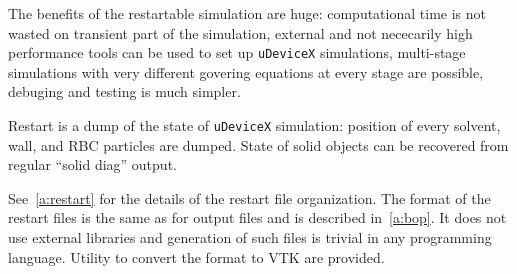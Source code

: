 The benefits of the restartable simulation are huge: computational
time is not wasted on transient part of the simulation, external and
not nececarily high performance tools can be used to
set up \texttt{uDeviceX} simulations, multi-stage simulations with very
different govering equations at every stage are possible, debuging and
testing is much simpler.

Restart is a dump of the state of \texttt{uDeviceX} simulation:
position of every solvent, wall, and RBC particles are dumped. State
of solid objects can be recovered from regular ``solid diag'' output.

See~\ref{a:restart} for the details of the restart file
organization. The format of the restart files is the same as for
output files and is described in~\ref{a:bop}. It does not use external
libraries and generation of such files is trivial in any programming
language. Utility to convert the format to VTK are provided.

